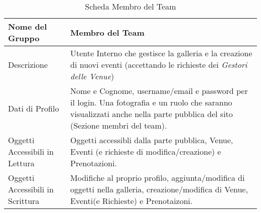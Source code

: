 \begin{table}[H]
    \begin{center}  
        \begin{tabular}{ | l | p{10cm} |} %
        \hline
        \textbf{Nome del Gruppo} & \textbf{Membro del Team}\\ \hline  
           
        Descrizione & Utente Interno che gestisce la galleria e la creazione di nuovi eventi (accettando le richieste dei \textit{Gestori delle Venue})\\ \hline  
           
        Dati di Profilo & Nome e Cognome, username/email e password per il login. Una fotografia e un ruolo che saranno visualizzati anche nella parte pubblica del sito (Sezione membri del team).\\ \hline  
           
        Oggetti Accessibili in Lettura & Oggetti accessibli dalla parte pubblica, Venue, Eventi (e richieste di modifica/creazione) e Prenotazioni.\\ \hline  
           
        Oggetti Accessibili in Scrittura & Modifiche al proprio profilo, aggiunta/modifica di oggetti nella galleria, creazione/modifica di Venue, Eventi(e Richieste) e Prenotaizoni.\\ \hline  
           
        \end{tabular}  
        \caption{Scheda Membro del Team}
    \end{center}  
\end{table}